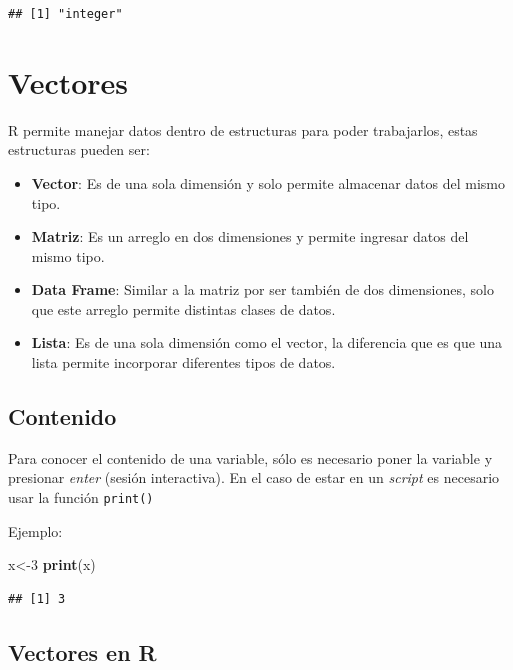 \documentclass[
]{book}
\newenvironment{Shaded}{\begin{snugshade}}{\end{snugshade}}
\newcommand{\DecValTok}[1]{\textcolor[rgb]{0.00,0.00,0.81}{#1}}
\newcommand{\FunctionTok}[1]{\textcolor[rgb]{0.13,0.29,0.53}{\textbf{#1}}}
\newcommand{\NormalTok}[1]{#1}
\newcommand{\OtherTok}[1]{\textcolor[rgb]{0.56,0.35,0.01}{#1}}
\providecommand{\tightlist}{%
  \setlength{\itemsep}{0pt}\setlength{\parskip}{0pt}}
\begin{document}
\begin{verbatim}
## [1] "integer"
\end{verbatim}

\chapter{Vectores}\label{estructura}

R permite manejar datos dentro de estructuras para poder trabajarlos, estas estructuras pueden ser:

\begin{itemize}
\tightlist
\item
  \textbf{Vector}: Es de una sola dimensión y solo permite almacenar datos del mismo tipo.
\item
  \textbf{Matriz}: Es un arreglo en dos dimensiones y permite ingresar datos del mismo tipo.
\item
  \textbf{Data Frame}: Similar a la matriz por ser también de dos dimensiones, solo que este arreglo permite distintas clases de datos.
\item
  \textbf{Lista}: Es de una sola dimensión como el vector, la diferencia que es que una lista permite incorporar diferentes tipos de datos.
\end{itemize}

\section{Contenido}\label{contenido}

Para conocer el contenido de una variable, sólo es necesario poner la variable y presionar \emph{enter} (sesión interactiva). En el caso de estar en un \emph{script} es necesario usar la función \texttt{print()}

Ejemplo:

\begin{Shaded}
\begin{Highlighting}[]
\NormalTok{x}\OtherTok{\textless{}{-}}\DecValTok{3}
\FunctionTok{print}\NormalTok{(x)}
\end{Highlighting}
\end{Shaded}

\begin{verbatim}
## [1] 3
\end{verbatim}

\section{Vectores en R}\label{vectors}
\end{document}
